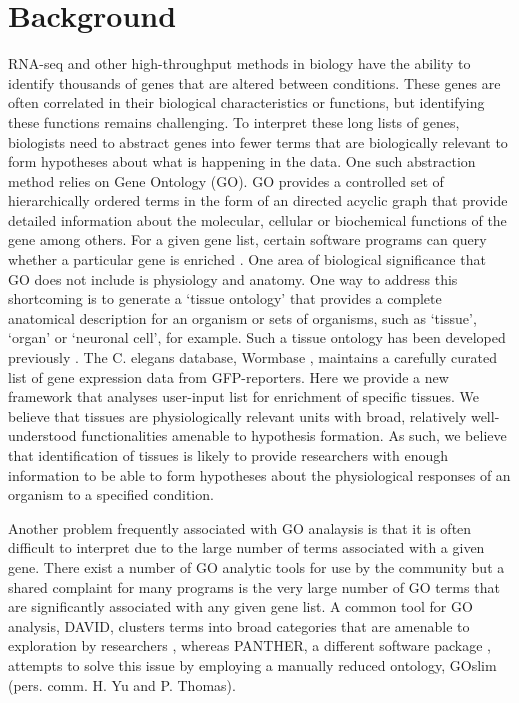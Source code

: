 \documentclass[linenumbers, doublespacing]{bmcart}
\begin{document}
\section*{Background}
	RNA-seq and other high-throughput methods in biology have the ability to identify thousands of genes that are altered between conditions. These genes are often correlated in their biological characteristics or functions, but identifying these functions remains challenging. To interpret these long lists of genes, biologists need to abstract genes into fewer terms that are biologically relevant to form hypotheses about what is happening in the data. One such abstraction method relies on Gene Ontology (GO). GO provides a controlled set of hierarchically ordered terms in the form of an directed acyclic graph  \cite{TheGeneOntologyConsortium2000, Ontology2009, TheGeneOntologyConsortium2015} that provide detailed information about the molecular, cellular or biochemical functions of the gene among others. For a given gene list, certain software programs can query whether a particular gene is enriched  \cite{Mi2009, McLean2010, Huang2009}. One area of biological significance that GO does not include is physiology and anatomy. One way to address this shortcoming is to generate a `tissue ontology' that provides a complete anatomical description for an organism or sets of organisms, such as `tissue', `organ' or `neuronal cell', for example. Such a tissue ontology has been developed previously \cite{Lee2003}.  The C. elegans  database, Wormbase \cite{Harris2014}, maintains a carefully curated list of gene expression data from GFP-reporters. 
	Here we provide a new framework that analyses user-input list for enrichment of specific tissues. We believe that tissues are physiologically relevant units with broad, relatively well-understood functionalities amenable to hypothesis formation. As such, we believe that identification of tissues is likely to provide researchers with enough information to be able to form hypotheses about the physiological responses of an organism to a specified condition. 
	
	Another problem frequently associated with GO analaysis is that it is often difficult to interpret due to the large number of terms associated with a given gene. There exist a number of GO analytic tools for use by the community but a shared complaint for many programs is the very large number of GO terms that are significantly associated with any given gene list.  A common tool for GO analysis, DAVID, clusters terms into broad categories that are amenable to exploration by researchers  \cite{Huang2007}, whereas PANTHER, a different software package  \cite{Mi2009, Mi2013}, attempts to solve this issue by employing a manually reduced ontology, GOslim (pers. comm. H. Yu and P. Thomas).
	
\end{document}
